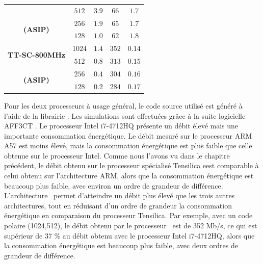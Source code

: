 \begin{table}
\begin{tabular}{ccccc}
                                                & $512$    & $3.9$  & $66$  & $1.7$ \\

     \multirow{2}{*}{\bf (ASIP)}                & $256$    & $1.9$  & $65$  & $1.7$ \\

                                                & $128$    & $1.0$  & $62$  & $1.8$ \\

    \midrule

    \multirow{2}{*}{\bf TT-SC-800MHz}            & $1024$  & $1.4$   & $352$ & $0.14$   \\ %

                                                & $512$    & $0.8$  & $313$ & $0.15$   \\ %

     \multirow{2}{*}{\bf (ASIP)}                & $256$    & $0.4$  & $304$ & $0.16$   \\ %

                                                & $128$    & $0.2$  & $284$ & $0.17$   \\ %

    \bottomrule
  \end{tabular}
\end{table}

Pour les deux processeurs à usage général, le code source utilisé est généré à l'aide de la librairie \cite{cassagne_efficient_2015}. Les simulations sont effectuées grâce à la suite logicielle AFF3CT \cite{aff3ct_aff3ct:_2016}. Le processeur Intel i7-4712HQ présente un débit élevé mais une importante consommation énergétique. Le débit mesuré sur le processeur ARM A57 est moins élevé, mais la consommation énergétique est plus faible que celle obtenue sur le processeur Intel. Comme nous l'avons vu dans le chapitre précédent, le débit obtenu sur le processeur spécialisé Tensilica eest comparable à celui obtenu sur l'architecture ARM, alors que la consommation énergétique est beaucoup plus faible, avec environ un ordre de grandeur de différence. L'architecture \TTSC~permet d'atteindre un débit plus élevé que les trois autres architectures, tout en réduisant d'un ordre de grandeur la consommation énergétique en comparaison du processeur Tensilica. Par exemple, avec un code polaire (1024,512), le débit obtenu par le processeur \TTSC~est de 352 Mb/s, ce qui est supérieur de 37 \% au débit obtenu avec le processeur Intel i7-4712HQ, alors que la consommation énergétique est beaucoup plus faible, avec deux ordres de grandeur de différence.


